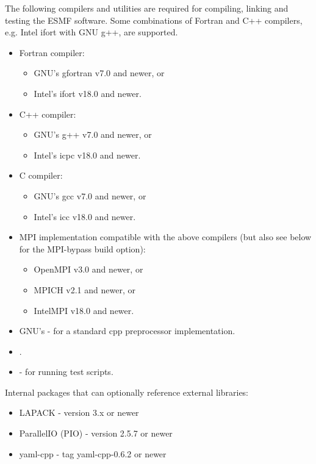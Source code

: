 

The following compilers and utilities are required for compiling, linking and
testing the ESMF software. Some combinations of Fortran and C++ compilers,
e.g. Intel ifort with GNU g++, are supported.
\begin{itemize}
\item Fortran compiler:
  \begin{itemize}
  \item GNU's gfortran v7.0 and newer, or
  \item Intel's ifort v18.0 and newer.
  \end{itemize} 
\item C++ compiler:
  \begin{itemize}
  \item GNU's g++ v7.0 and newer, or
  \item Intel's icpc v18.0 and newer.
  \end{itemize} 
\item C compiler:
  \begin{itemize}
  \item GNU's gcc v7.0 and newer, or
  \item Intel's icc v18.0 and newer.
  \end{itemize} 
\item MPI implementation compatible with the above compilers (but also see below
for the MPI-bypass build option):
  \begin{itemize}
  \item OpenMPI v3.0 and newer, or
  \item MPICH v2.1 and newer, or
  \item IntelMPI v18.0 and newer.
  \end{itemize} 
\item GNU's  -
for a standard cpp preprocessor implementation.
\item {}.
\item {} - for running
test scripts.
\end{itemize}

Internal packages that can optionally reference external libraries:
\begin{itemize}
\item LAPACK - version 3.x or newer
\item ParallelIO (PIO) - version 2.5.7 or newer
\item yaml-cpp - tag yaml-cpp-0.6.2 or newer
\end{itemize}

